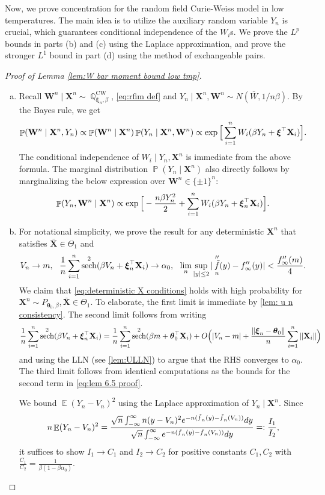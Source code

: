 \documentclass[preprint,reqno]{imsart}
\newcommand{\ttheta}{\boldsymbol{\theta}}
\DeclareMathOperator{\ft}{\tilde{\mathnormal f}}
\DeclareMathOperator{\sech}{sech}
\DeclareMathOperator{\EE}{\mathbb{E}}
\DeclareMathOperator{\PP}{\mathbb{P}}
\DeclareMathOperator{\QQ}{\mathbb{Q}}
\newcommand{\W}{\mathbf{W}}
\newcommand{\X}{\mathbf{X}}
\newcommand{\xxi}{\boldsymbol \xi}
\DeclareMathOperator{\sumin}{\sum_{\mathnormal i=1}^{\mathnormal n}}
\begin{document}
\begin{appendix}
Now, we prove concentration for the random field Curie-Weiss model in low temperatures. The main idea is to utilize the auxiliary random variable $Y_n$ is crucial, which guarantees conditional independence of the $W_i$s.
We prove the $L^p$ bounds in parts (b) and (c) using the Laplace approximation, and prove the stronger $L^1$ bound in part (d) using the method of exchangeable pairs.

\begin{proof}[Proof of Lemma \ref{lem:W bar moment bound low tmp}]
%


%
\begin{enumerate}[(a)]
\item Recall $\W^n \mid \X^n \sim \QQ^{\text{CW}}_{\xxi_n,\beta}$, \eqref{eq:rfim def} and $Y_n \mid \X^n, \W^n \sim N(\bar{W}, 1/{n\beta})$. By the Bayes rule, we get
$$\PP(\W^n \mid \X^n, Y_n) \propto \PP(\W^n \mid \X^n) \PP(Y_n \mid \X^n, \W^n) \propto \exp \Big[\sumin W_i(\beta Y_n + \xxi^\top \X_i) \Big].$$
The conditional independence of $W_i \mid Y_n, \X^n$ is immediate from the above formula. The marginal distribution $\PP(Y_n \mid \X^n)$ also directly follows by marginalizing the below expression over $\W^n \in \{\pm 1\}^n$:
$$\PP(Y_n, \W^n \mid \X^n) \propto \exp \Big[- \frac{n\beta Y_n^2}{2} +\sumin W_i(\beta Y_n + \xxi_n^\top \X_i) \Big].$$

\item For notational simplicity, we prove the result for any deterministic $\X^n$ that satisfies $\bar{\X}\in \Theta_1$ and
\begin{equation}\label{eq:deterministic X conditions}
    V_n \to m, ~~ \frac{1}{n} \sumin \sech^2(\beta V_n + \xxi_n^\top \X_i) \to \alpha_0, ~~ \lim_n \sup_{|y| \le 2} |\ft_n''(y) - f_{\infty}''(y)| < \frac{f_{\infty}''(m)}{4}.
\end{equation}
We claim that \eqref{eq:deterministic X conditions} holds with high probability for $\X^n \sim P_{\ttheta_0,\beta}, \bar{\X} \in \Theta_1$. To elaborate, the first limit is immediate by \ref{lem: u n consistency}. The second limit follows from writing 
$$\frac{1}{n} \sumin \sech^2(\beta V_n + \xxi_n^\top \X_i) = \frac{1}{n} \sumin \sech^2(\beta m + \ttheta_0^\top \X_i) + O\Big(|V_n-m| + \frac{\|\xxi_n - \ttheta_0\|}{n} \sumin\|\X_i\| \Big)$$
and using the LLN (see \cref{lem:ULLN}) to argue that the RHS converges to $\alpha_0$. The third limit follows from identical computations as the bounds for the second term in \eqref{eq:lem 6.5 proof}.
%

    \vspace{2mm}
    We bound $\EE(Y_n - V_n)^2$ using the Laplace approximation of $Y_n \mid \X^n$. Since
    $$n\EE(Y_n - V_n)^2 = \frac{\sqrt{n} \int_{-\infty}^{\infty} n(y - V_n)^2 e^{-n(\ft_n(y) - \ft_n(V_n))} dy}{\sqrt{n} \int_{-\infty}^{\infty} e^{-n(\ft_n(y) - \ft_n(V_n))} dy} =: \frac{I_1}{I_2},$$
    it suffices to show $I_1 \to C_1$ and $I_2 \to C_2$ for positive constants $C_1, C_2$ with $\frac{C_1}{C_2} = \frac{1}{\beta(1-\beta \alpha_0)}$.


\end{enumerate}
\end{proof}
\end{appendix}
\end{document}

